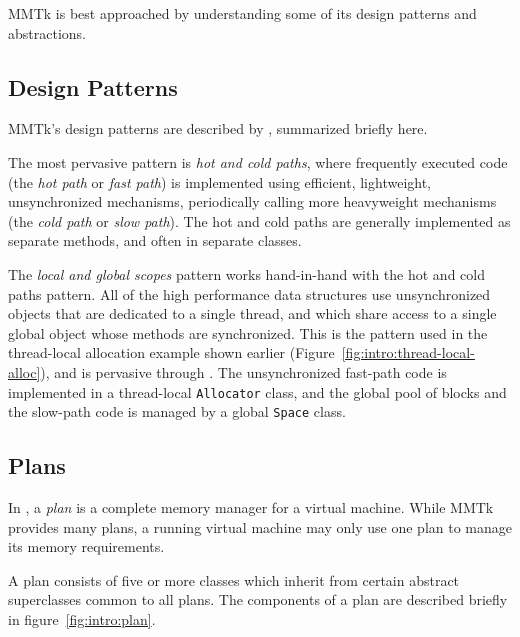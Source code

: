 MMTk is best approached by understanding some of its design patterns and abstractions.

\subsection{Design Patterns}

MMTk's design patterns are described by \citet{BCM:04}, summarized briefly here.  

The most pervasive pattern is \emph{hot and cold paths}, where frequently executed code
(the \emph{hot path} or \emph{fast path}) is implemented using efficient, lightweight, unsynchronized 
mechanisms, periodically calling more heavyweight mechanisms (the \emph{cold path} or \emph{slow path}).
The hot and cold paths are generally implemented as separate methods, and often in separate
classes.

The \emph{local and global scopes} pattern works hand-in-hand with the hot and cold paths pattern.
All of the high performance data structures use unsynchronized objects that are dedicated to 
a single thread, and which share access to a single global object whose methods are synchronized.
This is the pattern used in the thread-local allocation example shown earlier 
(Figure~\ref{fig:intro:thread-local-alloc}), and is pervasive through \mmtk.  The unsynchronized
fast-path code is implemented in a thread-local \lstinline|Allocator| class, and the global
pool of blocks and the slow-path code is managed by a global \lstinline|Space| class.

\subsection{Plans}
\label{sec:intro:plans}

In \mmtk, a \emph{plan} is a complete memory manager for a virtual
machine.  While MMTk provides many plans, a running virtual machine
may only use one plan to manage its memory requirements.  

A plan consists of five or more classes which inherit from certain
abstract superclasses common to all plans.  
The components of a plan are described briefly in figure~\ref{fig:intro:plan}.

